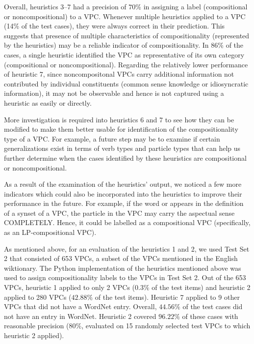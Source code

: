 \documentclass[output=paper
,modfonts
,nonflat]{langsci/langscibook}
\begin{document}
Overall, heuristics 3--7 had a precision of $70\%$ in assigning a label (compositional or noncompositional) to a VPC. Whenever multiple heuristics applied to a VPC (14\% of the test cases), they were always correct in their prediction. This suggests that presence of multiple characteristics of compositionality (represented by the heuristics) may be a reliable indicator of compositionality. In 86\% of the cases, a single heuristic identified the VPC as representative of its own category (compositional or noncompositional). Regarding the relatively lower performance of heuristic 7, since noncompositonal VPCs carry additional information not contributed by individual constituents (common sense knowledge or idiosyncratic information), it may not be observable and hence is not captured using a heuristic as easily or directly.

More investigation is required into heuristics 6 and 7 to see how they can be modified to make them better usable for identification of the compositionality type of a VPC. For example, a future step may be to examine if certain generalizations exist in terms of verb types and particle types that can help us further determine when the cases identified by these heuristics are compositional or noncompositional.

As a result of the examination of the heuristics' output, we noticed a few more indicators which could also be incorporated into the heuristics to %
improve their performance in the future. For example, if the word  or  appears in the definition of a synset of a VPC, the particle in the VPC may carry the aspectual sense COMPLETELY. Hence, it could be labelled as a compositional VPC (specifically, as an LP-compositional VPC).

As mentioned above, for an evaluation of the heuristics 1 and 2, we used Test Set 2 that consisted of 653 VPCs, a subset of the VPCs mentioned in the English wiktionary. The Python implementation of the heuristics mentioned above was used to assign compositionality labels to the VPCs in Test Set 2. Out of the 653 VPCs, heuristic 1 applied to only 2 VPCs ($0.3\%$ of the test items) and heuristic 2 applied to 280 VPCs ($42.88\%$ of the test items). Heuristic 7 applied to 9 other VPCs that did not have a WordNet entry. Overall, $44.56\%$ of the test cases did not have an entry in WordNet.  Heuristic 2 covered $96.22\%$ of these cases with reasonable precision ($80\%$, evaluated on 15 randomly selected test VPCs to which heuristic 2 applied).
\end{document}
